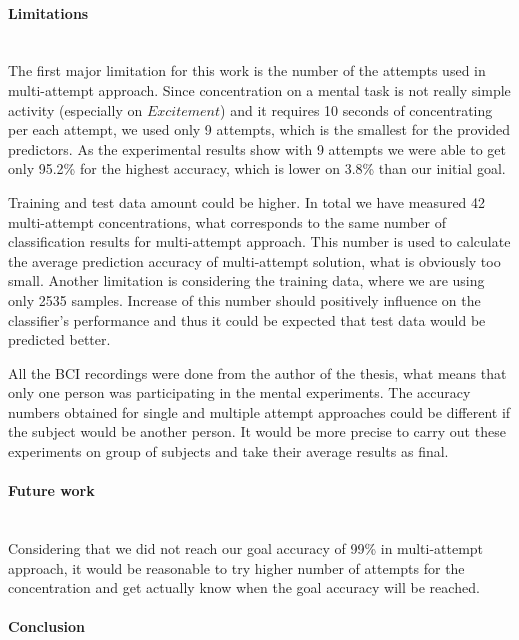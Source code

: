 \documentclass[12pt]{article}
\theoremstyle{definition}
\begin{document}
\paragraph{Limitations}~\\

The first major limitation for this work is the number of the attempts used in multi-attempt approach. Since concentration on a mental task is not really simple activity (especially on $Excitement$) and it requires 10 seconds of concentrating per each attempt, we used only 9 attempts, which is the smallest for the provided predictors. As the experimental results show with 9 attempts we were able to get only 95.2\% for the highest accuracy, which is lower on 3.8\% than our initial goal.

Training and test data amount could be higher. In total we have measured 42 multi-attempt concentrations, what corresponds to the same number of classification results for multi-attempt approach. This number is used to calculate the average prediction accuracy of multi-attempt solution, what is obviously too small.
Another limitation is considering the training data, where we are using only 2535 samples. Increase of this number should positively influence on the classifier's performance and thus it could be expected that test data would be predicted better.

All the BCI recordings were done from the author of the thesis, what means that only one person was participating in the mental experiments. The accuracy numbers obtained for single and multiple attempt approaches could be different if the subject would be another person. It would be more precise to carry out these experiments on group of subjects and take their average results as final.

\paragraph{Future work}~\\

Considering that we did not reach our goal accuracy of 99\% in multi-attempt approach, it would be reasonable to try higher number of attempts for the concentration  and get actually know when the goal accuracy will be reached. 

\paragraph{Conclusion}~\\
\end{document}
